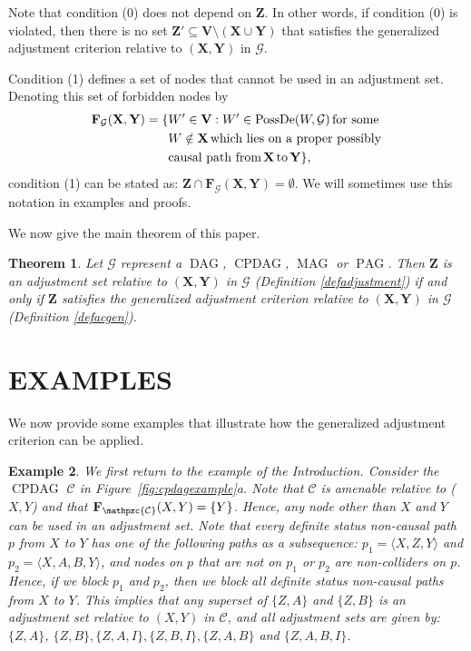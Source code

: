 \documentclass[]{article}
\DeclareMathOperator{\CPDAG}{CPDAG}
\DeclareMathOperator{\DAG}{DAG}
\DeclareMathOperator{\MAG}{MAG}
\DeclareMathOperator{\PAG}{PAG}
\DeclareMathOperator{\PossDe}{PossDe}
\newtheorem{theorem}{Theorem}[section]
\newtheorem{example}[theorem]{Example}
\theoremstyle{definition}
\theoremstyle{remark}
\newcommand{\vars}[1][V]{\mathbf{#1}}
\newcommand{\g}[1][G]{\mathcal{#1}}
\newcommand{\f}[2][X,Y]{\mathbf{F}_{\mathpzc{#2}}(#1)}
\newcommand{\fb}[2][X,Y]{\mathbf{F}_{#2}(\mathbf{#1})}%
\begin{document}
Note that condition (0) does not depend on $\mathbf{Z}$. In other words, if condition (0) is violated, then there is no set $\mathbf{Z'} \subseteq \vars \setminus (\mathbf{X} \cup\mathbf{Y})$ that satisfies the generalized adjustment criterion relative to $(\mathbf{X,Y})$ in $\g$.

Condition (1) defines a set of nodes that cannot be used in an adjustment set. Denoting this set of forbidden nodes by
\begin{align}\label{eq: def forbidden nodes}
   \fb{\g} = \{ & W' \in \vars: W' \in \PossDe(W,\g) \,\text{for some} \notag \\
   &  W \notin \mathbf{X} \,\text{which lies on a proper possibly} \notag \\
   &  \text{causal path from} \, \mathbf{X} \,\text{to}\, \mathbf{Y}\},
\end{align}
condition (1) can be stated as: $\mathbf{Z} \cap \fb{\g} = \emptyset$.
We will sometimes use this notation in examples and proofs.

We now give the main theorem of this paper.

\begin{theorem}
   Let $\g$ represent a $\DAG$, $\CPDAG$, $\MAG$ or $\PAG$. Then $\mathbf{Z}$ is an adjustment set relative to $(\mathbf{X},\mathbf{Y})$ in $\g$ (Definition \ref{defadjustment}) if and only if $\mathbf{Z}$ satisfies the generalized adjustment criterion  relative to $(\mathbf{X},\mathbf{Y})$ in $\g$ (Definition \ref{defacgen}).
   \label{thmgenac}
\end{theorem}

\section{EXAMPLES}\label{sec: examples}

We now provide some examples that illustrate how the generalized adjustment criterion can be applied.

\begin{example}
   We first return to the example of the Introduction. Consider the $\CPDAG$ $\g[C]$ in Figure~\ref{fig:cpdagexample}a. Note that $\g[C]$ is amenable relative to ($X,Y$) and that $\f{\g[C]} = \{ Y \}$. Hence, any node other than $X$ and $Y$ can be used in an adjustment set. Note that every definite status non-causal path $p$ from $X$ to $Y$ has one of the following paths as a subsequence: $p_1 = \langle X, Z,Y\rangle$ and $p_2 = \langle X, A,B, Y\rangle$, and nodes on $p$ that are not on $p_1$ or $p_2$ are non-colliders on $p$. Hence, if we block $p_1$ and $p_2$, then we block all definite status non-causal paths from $X$ to $Y$. This implies that any superset of $\{Z,A\}$ and $\{Z,B\}$ is an adjustment set relative to $(X,Y)$ in $\g[C]$, and all adjustment sets are given by: $\{Z,A\}$, $\{Z,B\},\{Z,A,I\},\{Z,B,I\},\{Z,A,B\}$ and $\{Z,A,B,I\}$.
  \label{ex1}
\end{example}
\end{document}
